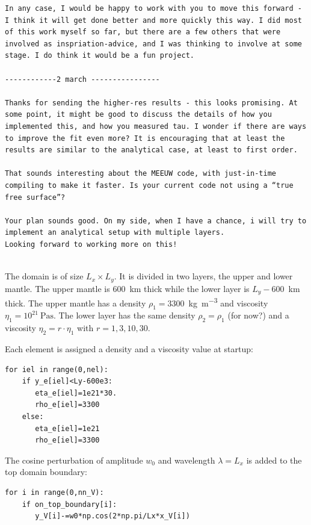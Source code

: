 \begin{verbatim}
In any case, I would be happy to work with you to move this forward - I think it will get done better and more quickly this way. I did most of this work myself so far, but there are a few others that were involved as inspriation-advice, and I was thinking to involve at some stage. I do think it would be a fun project.

------------2 march ----------------

Thanks for sending the higher-res results - this looks promising. At some point, it might be good to discuss the details of how you implemented this, and how you measured tau. I wonder if there are ways to improve the fit even more? It is encouraging that at least the results are similar to the analytical case, at least to first order.

That sounds interesting about the MEEUW code, with just-in-time compiling to make it faster. Is your current code not using a “true free surface”?

Your plan sounds good. On my side, when I have a chance, i will try to implement an analytical setup with multiple layers. 
Looking forward to working more on this!


\end{verbatim}





\newpage
The domain is of size $L_x\times L_y$. It is divided in two layers, 
the upper and lower mantle. The upper mantle is 600~\si{\km} thick
while the lower layer is $L_y-600$~\si{\km} thick.
The upper mantle has a density $\rho_1=3300$~\si{\kg\per\cubic\meter} 
and viscosity $\eta_1=10^{21}~\si{\pascal\second}$.
The lower layer has the same density $\rho_2=\rho_1$ 
(for now?) and a viscosity $\eta_2=r\cdot \eta_1$ with $r=1,3,10,30$.

Each element is assigned a density and a viscosity 
value at startup:

\begin{lstlisting}
for iel in range(0,nel):
    if y_e[iel]<Ly-600e3:
       eta_e[iel]=1e21*30.
       rho_e[iel]=3300
    else:
       eta_e[iel]=1e21
       rho_e[iel]=3300
\end{lstlisting}

The cosine perturbation of amplitude $w_0$ and
wavelength $\lambda=L_x$ is added to the top domain boundary:

\begin{lstlisting}
for i in range(0,nn_V):
    if on_top_boundary[i]:
       y_V[i]-=w0*np.cos(2*np.pi/Lx*x_V[i]) 
\end{lstlisting}

